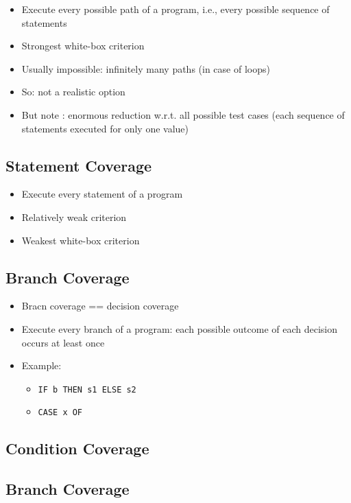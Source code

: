 \begin{itemize}
	\item Execute every possible path of a program, i.e., every possible sequence of statements
	\item Strongest white-box criterion
	\item Usually impossible: infinitely many paths (in case of loops)
	\item So: not a realistic option
	\item But note : enormous reduction w.r.t. all possible test cases (each sequence of statements executed for only one value)
\end{itemize}
		
\subsection{Statement Coverage}
			
\begin{itemize}
	\itemsep0em
	\item Execute every statement of a program
	\item Relatively weak criterion 
	\item Weakest white-box criterion
\end{itemize}
				
\subsection{Branch Coverage}
			
\begin{itemize}
	\item Bracn coverage == decision coverage
	\item Execute every branch of a program: each possible outcome of each decision occurs at least once
	\item Example:
	\begin{itemize}
		\item \verb|IF b THEN s1 ELSE s2|
		\item \verb|CASE x OF|
	\end{itemize}
\end{itemize}
			
\subsection{Condition Coverage}
			
\subsection{Branch Coverage}